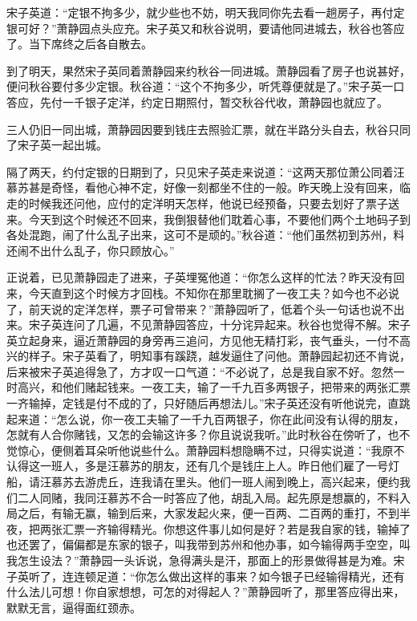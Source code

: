 \documentclass[12pt,UTF8]{ctexbook}
\begin{document}
{{{宋子英道：“定银不拘多少，就少些也不妨，明天我同你先去看一趟房子，再付定银可好？”萧静园点头应充。宋子英又和秋谷说明，要请他同进城去，秋谷也答应了。当下席终之后各自散去。

到了明天，果然宋子英同着萧静园来约秋谷一同进城。萧静园看了房子也说甚好，便问秋谷要付多少定银。秋谷道：“这个不拘多少，听凭尊便就是了。”宋子英一口答应，先付一千银子定洋，约定日期照付，暂交秋谷代收，萧静园也就应了。

三人仍旧一同出城，萧静园因要到钱庄去照验汇票，就在半路分头自去，秋谷只同了宋子英一起出城。

隔了两天，约付定银的日期到了，只见宋子英走来说道：“这两天那位萧公同着汪慕苏甚是奇怪，看他心神不定，好像一刻都坐不住的一般。昨天晚上没有回来，临走的时候我还问他，应付的定洋明天怎样，他说已经预备，只要去划好了票子送来。今天到这个时候还不回来，我倒狠替他们耽着心事，不要他们两个土地码子到各处混跑，闹了什么乱子出来，这可不是顽的。”秋谷道：“他们虽然初到苏州，料还闹不出什么乱子，你只顾放心。”

正说着，已见萧静园走了进来，子英埋冤他道：“你怎么这样的忙法？昨天没有回来，今天直到这个时候方才回栈。不知你在那里耽搁了一夜工夫？如今也不必说了，前天说的定洋怎样，票子可曾带来？”萧静园听了，低着个头一句话也说不出来。宋子英连问了几遍，不见萧静园答应，十分诧异起来。秋谷也觉得不解。宋子英立起身来，逼近萧静园的身旁再三追问，方见他无精打彩，丧气垂头，一付不高兴的样子。宋子英看了，明知事有蹊跷，越发逼住了问他。萧静园起初还不肯说，后来被宋子英追得急了，方才叹一口气道：“不必说了，总是我自家不好。忽然一时高兴，和他们赌起钱来。一夜工夫，输了一千九百多两银子，把带来的两张汇票一齐输掉，定钱是付不成的了，只好随后再想法儿。”宋子英还没有听他说完，直跳起来道：“怎么说，你一夜工夫输了一千九百两银子，你在此间没有认得的朋友，怎就有人合你赌钱，又怎的会输这许多？你且说说我听。”此时秋谷在傍听了，也不觉惊心，便侧着耳朵听他说些什么。萧静园料想隐瞒不过，只得实说道：“我原不认得这一班人，多是汪慕苏的朋友，还有几个是钱庄上人。昨日他们雇了一号灯船，请汪慕苏去游虎丘，连我请在里头。他们一班人闹到晚上，高兴起来，便约我们二人同赌，我同汪慕苏不合一时答应了他，胡乱入局。起先原是想赢的，不料入局之后，有输无赢，输到后来，大家发起火来，便一百两、二百两的重打，不到半夜，把两张汇票一齐输得精光。你想这件事儿如何是好？若是我自家的钱，输掉了也还罢了，偏偏都是东家的银子，叫我带到苏州和他办事，如今输得两手空空，叫我怎生设法？”萧静园一头诉说，急得满头是汗，那面上的形景做得甚是为难。宋子英听了，连连顿足道：“你怎么做出这样的事来？如今银子已经输得精光，还有什么法儿可想！你自家想想，可怎的对得起人？”萧静园听了，那里答应得出来，默默无言，逼得面红颈赤。

}}}
\end{document}
